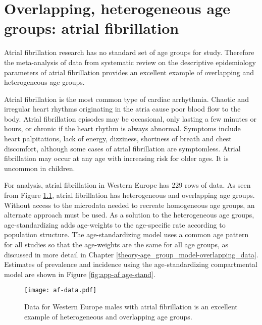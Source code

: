 \chapter{Overlapping, heterogeneous age groups: atrial fibrillation}
\label{applications-age_groups}

Atrial fibrillation research has no standard set of age groups for study.  Therefore the meta-analysis of data from systematic review on the descriptive epidemiology parameters of atrial fibrillation provides an excellent example of overlapping and heterogeneous age groups.

Atrial fibrillation is the most common type of cardiac arrhythmia.  Chaotic and irregular heart rhythms originating in the atria cause poor blood flow to the body.  Atrial fibrillation episodes may be occasional, only lasting a few minutes or hours, or chronic if the heart rhythm is always abnormal.  Symptoms include heart palpitations, lack of energy, dizziness, shortness of breath and chest discomfort, although some cases of atrial fibrillation are symptomless.  Atrial fibrillation may occur at any age with increasing risk for older ages.  It is uncommon in children. \cite{rich_epidemiology_2009, rho_asymptomoatic_2005, american_acc_2006, radford_atiral_1977}

For analysis, atrial fibrillation in Western Europe has 229 rows of data.  As seen from Figure \ref{fig:app-af data}, atrial fibrillation has heterogeneous and overlapping age groups.  Without access to the microdata needed to recreate homogeneous age groups, an alternate approach must be used.  As a solution to the heterogeneous age groups, age-standardizing adds age-weights to the age-specific rate according to population structure.  The age-standardizing model uses a common age pattern for all studies so that the age-weights are the same for all age groups, as discussed in more detail in Chapter \ref{theory-age_group_model-overlapping_data}.  Estimates of prevalence and incidence using the age-standardizing compartmental model are shown in Figure \ref{fig:app-af age-stand}.

    \begin{figure}[h]
        \begin{center}
            \texttt{[image: af-data.pdf]}
            \caption{Data for Western Europe males with atrial fibrillation is an excellent example of heterogeneous and overlapping age groups.}
            \label{fig:app-af data}
        \end{center}
    \end{figure}

